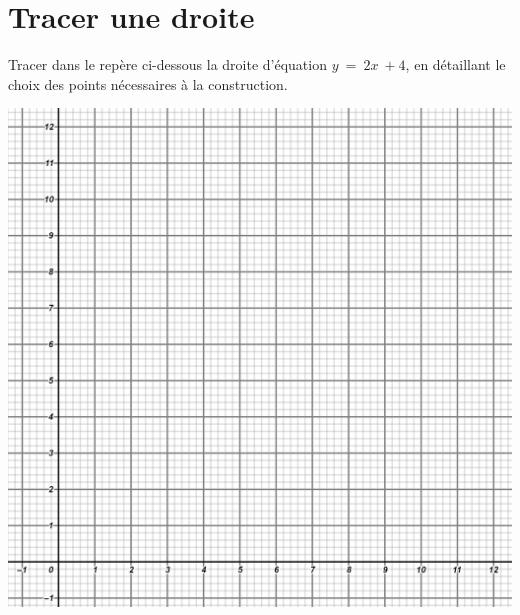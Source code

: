 \section{Tracer une droite}

\begin{questions}
	\question[5] Tracer dans le repère ci-dessous la droite d'équation $y\: = \: 2x \: + 4$, en détaillant le choix des points nécessaires à la construction.
	
	\begin{center}
		\includegraphics[scale=0.25]{img/vide_2}
	\end{center}

	\fillwithdottedlines{6cm}
\end{questions}
